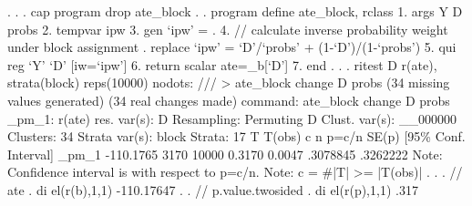 . 
. 
. cap program drop ate_block
{\smallskip}
. 
. program define ate_block, rclass
  1. args Y D probs
  2. tempvar ipw
  3. gen `ipw' = .
  4. // calculate inverse probability weight under block assignment
. replace `ipw' = `D'/`probs' + (1-`D')/(1-`probs')
  5. qui reg `Y' `D' [iw=`ipw']
  6. return scalar ate=_b[`D']
  7. end 
{\smallskip}
. 
. 
. ritest D r(ate), strata(block) reps(10000) nodots: ///
> ate_block change D probs
(34 missing values generated)
(34 real changes made)
{\smallskip}
      command:  ate_block change D probs
        _pm_1:  r(ate)
  res. var(s):  D
   Resampling:  Permuting D
Clust. var(s):  __000000
     Clusters:  34
Strata var(s):  block
       Strata:  17
{\smallskip}
T            {\VBAR}     T(obs)       c       n   p=c/n   SE(p) [95\% Conf. Interval]
       _pm_1 {\VBAR}  -110.1765    3170   10000  0.3170  0.0047  .3078845   .3262222
Note: Confidence interval is with respect to p=c/n.
Note: c = \#{\lbr}|T| >= |T(obs)|{\rbr}
{\smallskip}
. 
. 
. // ate
. di el(r(b),1,1)
-110.17647
{\smallskip}
. 
. // p.value.twosided
. di el(r(p),1,1)
.317
{\smallskip}

